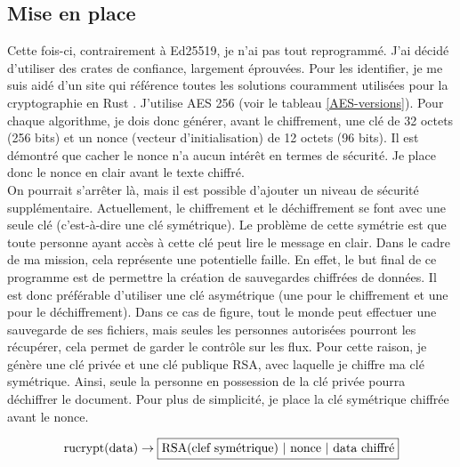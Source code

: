 \documentclass[a4paper, 12pt]{article}
\begin{document}
\subsection{Mise en place}
Cette fois-ci, contrairement à Ed25519, je n'ai pas tout reprogrammé. J'ai décidé d'utiliser des crates de confiance, largement éprouvées. Pour les identifier, je me suis aidé d'un site qui référence toutes les solutions couramment utilisées pour la cryptographie en Rust \cite{bddrustcrypto}. J'utilise AES 256 (voir le tableau \ref{AES-versions}). Pour chaque algorithme, je dois donc générer, avant le chiffrement, une clé de 32 octets (256 bits) et un nonce (vecteur d'initialisation) de 12 octets (96 bits). Il est démontré que cacher le nonce n'a aucun intérêt en termes de sécurité. Je place donc le nonce en clair avant le texte chiffré. \\

On pourrait s'arrêter là, mais il est possible d'ajouter un niveau de sécurité supplémentaire. Actuellement, le chiffrement et le déchiffrement se font avec une seule clé (c'est-à-dire une clé symétrique). Le problème de cette symétrie est que toute personne ayant accès à cette clé peut lire le message en clair. Dans le cadre de ma mission, cela représente une potentielle faille. En effet, le but final de ce programme est de permettre la création de sauvegardes chiffrées de données. Il est donc préférable d'utiliser une clé asymétrique (une pour le chiffrement et une pour le déchiffrement). Dans ce cas de figure, tout le monde peut effectuer une sauvegarde de ses fichiers, mais seules les personnes autorisées pourront les récupérer, cela permet de garder le contrôle sur les flux. Pour cette raison, je génère une clé privée et une clé publique RSA, avec laquelle je chiffre ma clé symétrique. Ainsi, seule la personne en possession de la clé privée pourra déchiffrer le document. Pour plus de simplicité, je place la clé symétrique chiffrée avant le nonce.


$$
\text{rucrypt(data)} \rightarrow \fbox{RSA(clef symétrique) | nonce | data chiffré}
$$


\printbibliography
\end{document}
